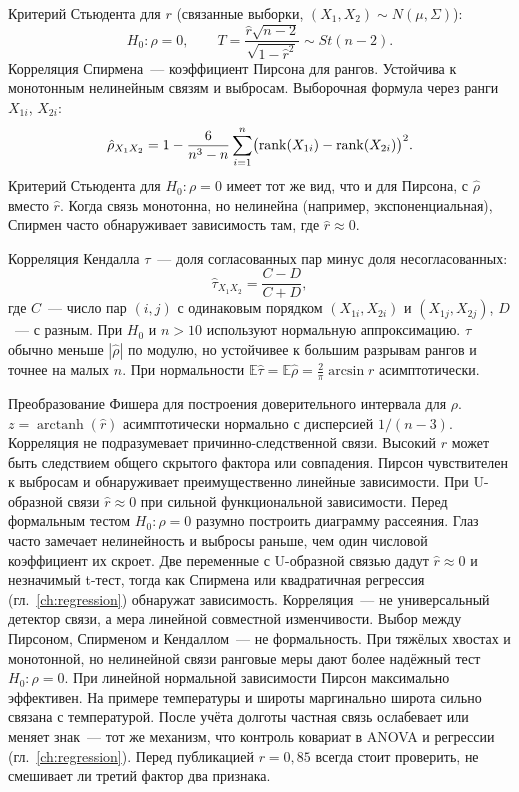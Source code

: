 Критерий Стьюдента для $r$ (связанные выборки, $(X_1,X_2)\sim N(\mu,\Sigma)$): \[ H_0\colon \rho=0,\qquad T=\frac{\hat r\sqrt{n-2}}{\sqrt{1-\hat r^2}}\sim St(n-2).
\] Корреляция Спирмена~--- коэффициент Пирсона для рангов. Устойчива к монотонным нелинейным связям и выбросам.
Выборочная формула через ранги $X_{1i}$, $X_{2i}$: \[ \hat\rho_{X_1X_2}=1-\frac{6}{n^3-n}\sum_{i=1}^n \bigl(\operatorname{rank}(X_{1i})-\operatorname{rank}(X_{2i})\bigr)^2.
\] Критерий Стьюдента для $H_0\colon\rho=0$ имеет тот же вид, что и для Пирсона, с $\hat\rho$ вместо $\hat r$.
Когда связь монотонна, но нелинейна (например, экспоненциальная), Спирмен часто обнаруживает зависимость там, где $\hat r\approx 0$.

Корреляция Кендалла $\tau$~--- доля согласованных пар минус доля несогласованных: \[ \hat\tau_{X_1X_2}=\frac{C-D}{C+D}, \] где $C$~--- число пар $(i,j)$ с одинаковым порядком $(X_{1i},X_{2i})$ и $(X_{1j},X_{2j})$, $D$~--- с разным.
При $H_0$ и $n>10$ используют нормальную аппроксимацию. $\hat\tau$ обычно меньше $|\hat\rho|$ по модулю, но устойчивее к большим разрывам рангов и точнее на малых $n$.
При нормальности $\mathbb E\hat\tau=\mathbb E\hat\rho= \frac{2}{\pi}\arcsin r$ асимптотически.

Преобразование Фишера для построения доверительного интервала для $\rho$. $z=\operatorname{arctanh}(\hat r)$ асимптотически нормально с дисперсией $1/(n-3)$.
Корреляция не подразумевает причинно-следственной связи. Высокий $r$ может быть следствием общего скрытого фактора или совпадения.
Пирсон чувствителен к выбросам и обнаруживает преимущественно линейные зависимости. При U-образной связи $\hat r\approx 0$ при сильной функциональной зависимости.
Перед формальным тестом $H_0\colon\rho=0$ разумно построить диаграмму рассеяния. Глаз часто замечает нелинейность и выбросы раньше, чем один числовой коэффициент их скроет.
Две переменные с U-образной связью дадут $\hat r\approx 0$ и незначимый t-тест, тогда как Спирмена или квадратичная регрессия (гл.~\ref{ch:regression}) обнаружат зависимость.
Корреляция~--- не универсальный детектор связи, а мера линейной совместной изменчивости.
Выбор между Пирсоном, Спирменом и Кендаллом~--- не формальность. При тяжёлых хвостах и монотонной, но нелинейной связи ранговые меры дают более надёжный тест $H_0\colon\rho=0$. При линейной нормальной зависимости Пирсон максимально эффективен.
На примере температуры и широты маргинально широта сильно связана с температурой. После учёта долготы частная связь ослабевает или меняет знак~--- тот же механизм, что контроль ковариат в ANOVA и регрессии (гл.~\ref{ch:regression}).
Перед публикацией $r=0{,}85$ всегда стоит проверить, не смешивает ли третий фактор два признака.

